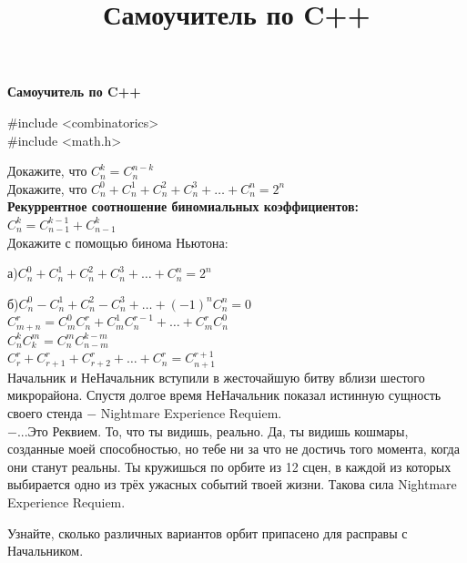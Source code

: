 \centerline{\bf \Huge Самоучитель по C++}
\title{Самоучитель по C++}
\begin{flushright}
    \scriptsize \#include <combinatorics> \\ \#include <math.h> \\
\end{flushright}

Докажите, что $C_n^k=C_n^{n-k}$\\

 Докажите, что $C_n^0+C_n^1+C_n^2+C_n^3+\dotsc+C_n^n=2^n$\\

\textbf{Рекуррентное соотношение биномиальных коэффициентов:} $C_n^k = C_{n-1}^{k-1} + C_{n-1}^k$\\

Докажите с помощью бинома Ньютона:

а)$C_n^0+C_n^1+C_n^2+C_n^3+\dotsc+C_n^n=2^n$

б)$C_n^0-C_n^1+C_n^2-C_n^3+\dotsc+(-1)^n C_n^n=0$\\

$C_{m+n}^r = C_m^0 C_n^r + C_m^1 C_n^{r-1}+\dotsc+C_m^r C_n^0$\\

$C_n^k C_k^m=C_n^m C_{n-m}^{k-m}$\\

$C_r^r+C_{r+1}^r+C_{r+2}^r+\dotsc+C_{n}^r=C_{n+1}^{r+1}$\\

Начальник и НеНачальник вступили в жесточайшую битву вблизи шестого микрорайона. Спустя долгое время НеНачальник показал истинную сущность своего стенда $-$ Nightmare Experience Requiem.\\
$-$...Это Реквием. То, что ты видишь, реально. Да, ты видишь кошмары, созданные моей способностью, но тебе ни за что не достичь того момента, когда они станут реальны. Ты кружишься по орбите из 12 сцен, в каждой из которых выбирается одно из трёх ужасных событий твоей жизни. Такова сила Nightmare Experience Requiem.

Узнайте, сколько различных вариантов орбит припасено для расправы с Начальником. 